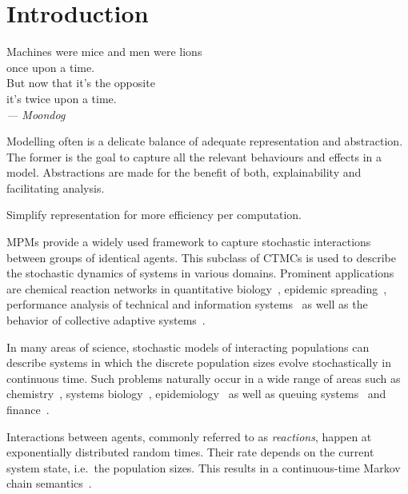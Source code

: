\chapter{Introduction}
\begin{center}
 Machines were mice and men were lions\\
    once upon a time.\\
    But now that it's the opposite\\
    it's twice upon a time.\\
    \medskip
        \emph{--- Moondog}
\end{center}
\noindent
Modelling often is a delicate balance of adequate representation and abstraction.
The former is the goal to capture all the relevant behaviours and effects in a model.
Abstractions are made for the benefit of both, explainability and facilitating analysis.

Simplify representation for more efficiency per computation.



\Acfp{MPM} provide a
widely used framework to capture stochastic interactions between groups of identical agents.
This subclass of \acfp{CTMC}  is used
to describe the stochastic dynamics of systems in various domains.
Prominent applications are chemical reaction networks in quantitative
biology~\parencite{BuchWolkenhauer},
epidemic spreading~\parencite{porter2016dynamical}, performance analysis  of technical and
information systems~\parencite{bortolussi2013continuous,gast2019} as well as the behavior of
collective adaptive systems~\parencite{bernardo2016}.








In many areas of science, stochastic models  of interacting populations can describe systems in which the discrete population sizes evolve stochastically in continuous time.
Such problems naturally occur in a wide range of areas such as chemistry~\parencite{gillespie1977exact}, systems biology~\parencite{wilkinson2018stochastic,BuchWolkenhauer}, epidemiology~\parencite{mode2000stochastic} as well as    queuing systems~\parencite{breuer2003markov} and finance~\parencite{pardoux2008markov}.

Interactions between agents, commonly referred to as \emph{reactions}, happen at exponentially distributed random times. 
Their rate depends on the current system state, i.e.\ the population sizes.
This results in a continuous-time Markov chain semantics~\parencite{anderson2012continuous}.




